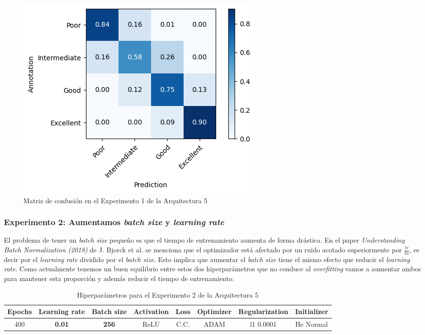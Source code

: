 \documentclass{article}
\begin{document}
			\begin{figure}[!h]
				\begin{center}
					\includegraphics[scale=0.7]{d-cm-a5-e1.png}		
					\caption{Matriz de confusi\'on en el Experimento 1 de la Arquitectura 5}	
					\label{d-cm-a5-e1}
				\end{center}
			\end{figure}
		
		\subsubsection{Experimento 2: Aumentamos \textit{batch size} y \textit{learning rate}}
		\label{d-s-a5-e2}
			El problema de tener un \textit{batch size} peque\~no es que el tiempo de entrenamiento aumenta de forma dr\'astica. En el paper \textit{Understanding Batch Normalization (2018)} de J. Bjorck et al. se menciona que el optimizador est\'a afectado por un ruido acotado superiormente por $\frac{lr}{bs}$, es decir por el \textit{learning rate} dividido por el \textit{batch size}. Esto implica que aumentar el \textit{batch size} tiene el mismo efecto que reducir el \textit{learning rate}. Como actualmente tenemos un buen equilibrio entre estos dos hiperpar\'ametros que no conduce al \textit{overfitting} vamos a aumentar ambos para mantener esta proporci\'on y adem\'as reducir el tiempo de entrenamiento.
		
			\begin{table}[!h]
				\begin{center}
					\begin{tabular}{| c | c | c | c | c | c | c | c |}
						\textbf{Epochs} & \textbf{Learning rate} & \textbf{Batch size} & \textbf{Activation} & \textbf{Loss} & \textbf{Optimizer} & \textbf{Regularization} & \textbf{Initializer}\\ \hline
						 400 & \textbf{0.01} & \textbf{256} & ReLU & C.C. & ADAM & l1 0.0001 & He Normal
					\end{tabular}
					\caption{Hiperpar\'ametros para el Experimento 2 de la Arquitectura 5}
					\label{tab:hip-d-a5-e2}
				\end{center}
			\end{table}
			
\end{document}
